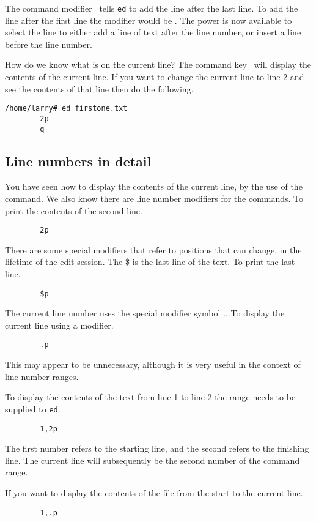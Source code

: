 The command modifier \key{\$}\ tells {\tt ed} to add the line after the last 
line. To add the line after the first line the modifier would be .
The power is now available to select the line to either add a line of text
after the line number, or insert a line before the line number.

How do we know what is on the current line? The command key \ 
will display the contents of the current line. If you want to change
the current line to line 2 and see the contents of that line then do
the following.
\begin{verbatim}
/home/larry# ed firstone.txt
        2p
        q
\end{verbatim}

\subsection{Line numbers in detail}
        You have seen how to display the contents of the current line, by
the use of the \key{p} command. We also know there are line number modifiers
for the commands. To print the contents of the second line.
\begin{verbatim}
        2p
\end{verbatim}

        There are some special modifiers that refer to positions that can
change, in the lifetime of the edit session. The {\key \$} is the last line
of the text. To print the last line.
\begin{verbatim}
        $p
\end{verbatim}

The current line number uses the special modifier symbol {\key .}. To
display the current line using a modifier.
\begin{verbatim}
        .p
\end{verbatim}

This may appear to be unnecessary, although it is very useful in the context of
line number ranges.

To display the contents of the text from line 1 to line 2 the range needs 
to be supplied to {\tt ed}.
\begin{verbatim}
        1,2p
\end{verbatim}

The first number refers to the starting line, and the second refers to the
finishing line. The current line will subsequently be the second number of the command
range. 

        If you want to display the contents of the file from the start to
the current line.
\begin{verbatim}
        1,.p
\end{verbatim}

